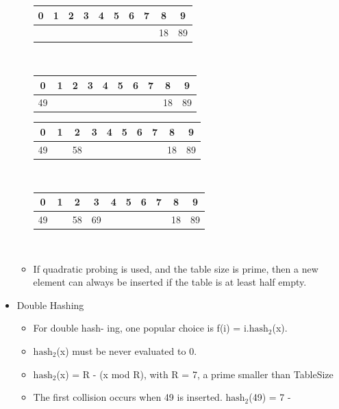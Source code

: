 \documentclass[a4paper,oneside]{book}
\begin{document}
\begin{itemize}
\begin{itemize}
\begin{tabular}[H]{|cccccccccc|}
\hline
0 & 1 & 2 & 3 & 4 & 5 & 6 & 7 & 8 & 9\\ \hline
& & & & & & & & 18 & 89\\ \hline
\end{tabular}\\
\begin{tabular}[H]{|cccccccccc|}
\hline
0 & 1 & 2 & 3 & 4 & 5 & 6 & 7 & 8 & 9\\ \hline
49 &  & & & & & & & 18 & 89\\ \hline
\end{tabular}
\begin{tabular}[H]{|cccccccccc|}
\hline
0 & 1 & 2 & 3 & 4 & 5 & 6 & 7 & 8 & 9\\ \hline
 49 &  & 58 & & & & & & 18 & 89 \\ \hline
\end{tabular}\\
\begin{tabular}[H]{|cccccccccc|}
\hline
0 & 1 & 2 & 3 & 4 & 5 & 6 & 7 & 8 & 9\\ \hline
49 &  & 58 & 69 & & & & & 18 & 89\\ \hline
\end{tabular}\\
\item \begin{theorem}
If quadratic probing is used, and the table size is prime, then a new element can always
be inserted if the table is at least half empty.
\end{theorem}
\end{itemize}
\item Double Hashing\begin{itemize}
  \item For double hash-
ing, one popular choice is f(i) = i.$\text{hash}_2$(x).
\item $\text{hash}_2$(x) must be never evaluated to 0.
\item $\text{hash}_2$(x) = R - (x mod R), with R = 7, a prime smaller than
TableSize
\item The first collision occurs when 49 is inserted. $\text{hash}_2$(49) = 7 -

\end{itemize}
\end{itemize}
\end{document}
